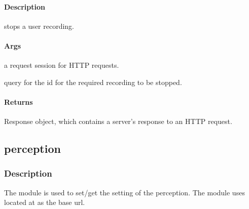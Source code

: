 \documentclass[letterpaper,10pt,english]{sphinxmanual}
\begin{document}
\begin{fulllineitems}
\label{\detokenize{gemini_lidar_hub_API:gemini_lidar_hub_API.stop_lidar_hub_rec}}
\pysigstartsignatures
{}
\pysigstopsignatures

\paragraph{Description}
\label{\detokenize{gemini_lidar_hub_API:id53}}
\sphinxAtStartPar
stops a user recording.


\paragraph{Args}
\label{\detokenize{gemini_lidar_hub_API:id54}}\begin{description}
\sphinxAtStartPar
a request session for HTTP requests.

\sphinxAtStartPar
query for the id for the required recording to be stopped.

\end{description}


\paragraph{Returns}
\label{\detokenize{gemini_lidar_hub_API:id55}}\begin{description}
\sphinxAtStartPar
Response object, which contains a server’s response to an HTTP request.

\end{description}

\end{fulllineitems}


\sphinxstepscope


\subsection{perception}
\label{\detokenize{gemini_perception_API:perception}}\label{\detokenize{gemini_perception_API::doc}}

\subsubsection{Description}
\label{\detokenize{gemini_perception_API:description}}
\sphinxAtStartPar
The module is used to set/get the setting of the perception.
The module uses  located at {\hyperref[\detokenize{gemini_login::doc}]{}} as the base url.
\end{document}
